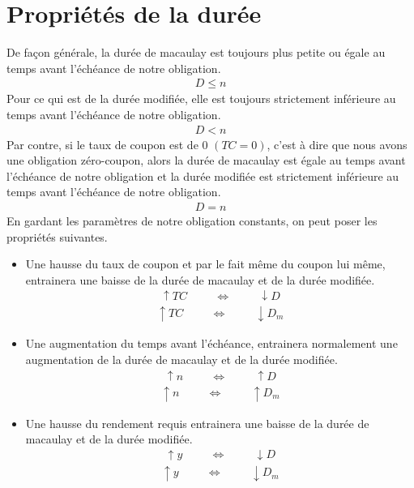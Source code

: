 \documentclass[12pt]{article}
\begin{document}
\section{Propriétés de la durée}
De façon générale,  la durée de macaulay est toujours plus petite ou égale au temps avant l'échéance de notre obligation. 
\begin{align*}
D \le n
\end{align*}
Pour ce qui est de la durée modifiée, elle est toujours strictement inférieure au temps avant l'échéance de notre obligation. 
\begin{align*}
D < n 
\end{align*}
Par contre, si le taux de coupon est de 0 $(TC=0)$,  c'est à dire que nous avons une obligation zéro-coupon, alors la durée de macaulay  est égale au temps avant l'échéance de notre obligation et la durée modifiée est strictement inférieure au temps avant l'échéance de notre obligation.
\begin{align*}
D=n 
\end{align*}
En gardant les paramètres de notre obligation constants,  on peut poser les propriétés suivantes.
\begin{itemize}
\item Une hausse du taux de coupon et par le fait même du coupon lui même, entrainera une baisse de la durée de macaulay et de la durée modifiée.
\begin{align*}
\uparrow TC \hspace{1cm} \Longleftrightarrow \hspace{1cm} \downarrow D 
\end{align*}
\begin{align*}
\uparrow TC \hspace{1cm} \Longleftrightarrow \hspace{1cm} \downarrow D_m 
\end{align*}
\item Une augmentation du temps avant l'échéance, entrainera normalement une augmentation de la durée de macaulay et de la durée modifiée.
\begin{align*}
\uparrow n \hspace{1cm} \Longleftrightarrow \hspace{1cm} \uparrow D 
\end{align*}
\begin{align*}
\uparrow n \hspace{1cm} \Longleftrightarrow \hspace{1cm} \uparrow D_m 
\end{align*}
\item Une hausse du rendement requis entrainera une baisse de la durée de macaulay et de la durée modifiée.
\begin{align*}
\uparrow y \hspace{1cm} \Longleftrightarrow \hspace{1cm} \downarrow D 
\end{align*}
\begin{align*}
\uparrow y \hspace{1cm} \Longleftrightarrow \hspace{1cm} \downarrow D_m 
\end{align*}
\end{itemize}
\end{document}
